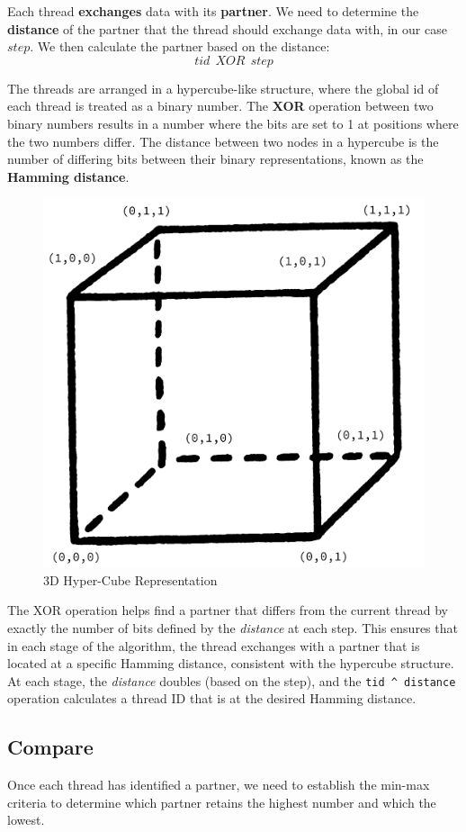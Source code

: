 \documentclass[12pt]{report}
\begin{document}
Each thread \textbf{exchanges} data with its \textbf{partner}. We need to determine the \textbf{distance} of the partner that the thread should exchange data with, in our case $step$. We then calculate the partner based on the distance: $$tid \:\: XOR \:\: step$$

The threads are arranged in a hypercube-like structure, where the global id of each thread is treated as a binary number. The \textbf{XOR} operation between two binary numbers results in a number where the bits are set to 1 at positions where the two numbers differ. The distance between two nodes in a hypercube is the number of differing bits between their binary representations, known as the \textbf{Hamming distance}. 

\begin{figure}[H]
    \centering
    \includegraphics[width=0.5\linewidth]{assets/cube.png}
    \caption{3D Hyper-Cube Representation}
    \label{fig:enter-label}
\end{figure}

The XOR operation helps find a partner that differs from the current thread by exactly the number of bits defined by the \textit{distance} at each step. This ensures that in each stage of the algorithm, the thread exchanges with a partner that is located at a specific Hamming distance, consistent with the hypercube structure. At each stage, the \textit{distance} doubles (based on the step), and the \verb|tid ^ distance| operation calculates a thread ID that is at the desired Hamming distance.

\subsection{Compare}

Once each thread has identified a partner, we need to establish the min-max criteria to determine which partner retains the highest number and which the lowest.
\end{document}
